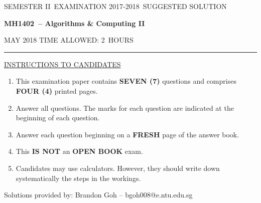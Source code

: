 \documentclass[12pt]{article}
\newcommand{\masunitnumber}{MH1402}
\newcommand{\examdate}{MAY 2018}
\newcommand{\academicyear}{2017-2018}
\newcommand{\semester}{II}
\newcommand{\coursename}{Algorithms \& Computing II}
\newcommand{\numberofhours}{2}
\begin{document}
\setlength{\headsep}{5truemm}
\setlength{\headheight}{14.5truemm}
\setlength{\voffset}{-0.45truein}
\renewcommand{\headrulewidth}{0.0pt}
\begin{center}
SEMESTER \semester\ EXAMINATION \academicyear ~SUGGESTED SOLUTION
\end{center}
\begin{center}
{\bf \masunitnumber\ -- \coursename}
\end{center}
\vspace{20truemm}

\noindent \examdate\hspace{55truemm} TIME ALLOWED: \numberofhours\ HOURS

\vspace{19truemm}
\hrule
\vspace{19truemm}
\noindent\underline{INSTRUCTIONS TO CANDIDATES}
\vspace{8truemm}
\begin{enumerate}
\item This examination paper contains {\bf SEVEN (7)} questions and comprises 
{\bf FOUR (4)} printed pages.

\item Answer all questions. 
The marks for each question are indicated at the beginning of each question.


\item Answer each question beginning on a {\bf FRESH} page of the answer book.

\item This {\bf IS NOT} an {\bf OPEN BOOK} exam.

\item Candidates may use calculators. However, they should write down systematically the steps in the workings.
\end{enumerate}

\newpage
\lhead{}
\rhead{\masunitnumber}
\chead{}
\lfoot{}
\cfoot{\thepage}
\rfoot{}
\setlength{\footskip}{45pt}
\noindent Solutions provided by:
Brandon Goh -- bgoh008@e.ntu.edu.sg
\end{document}
